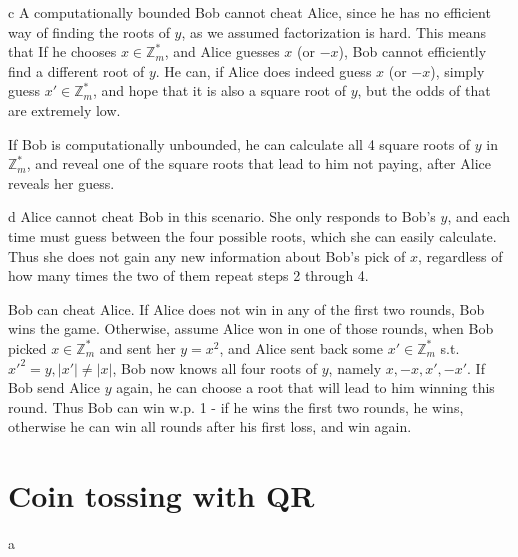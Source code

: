 \documentclass{article}
\begin{document}
\begin{paragraph}
    c A computationally bounded Bob cannot cheat Alice, since he has no efficient way of finding the roots of \(y\), as we assumed factorization is hard. This means that If he chooses \(x \in \mathbb{Z}^*_m\), and Alice guesses \(x\) (or \(-x\)), Bob cannot efficiently find a different root of \(y\). He can, if Alice does indeed guess \(x\) (or \(-x\)), simply guess \(x' \in \mathbb{Z}^*_m\), and hope that it is also a square root of \(y\), but the odds of that are extremely low.
    
    If Bob is computationally unbounded, he can calculate all 4 square roots of \(y\) in \(\mathbb{Z}^*_m\), and reveal one of the square roots that lead to him not paying, after Alice reveals her guess.
\end{paragraph}

\begin{paragraph}
    d Alice cannot cheat Bob in this scenario. She only responds to Bob's \(y\), and each time must guess between the four possible roots, which she can easily calculate. Thus she does not gain any new information about Bob's pick of \(x\), regardless of how many times the two of them repeat steps 2 through 4.
    
    Bob can cheat Alice. If Alice does not win in any of the first two rounds, Bob wins the game. Otherwise, assume Alice won in one of those rounds, when Bob picked \(x \in \mathbb{Z}^*_m\) and sent her \(y = x^2\), and Alice sent back some \(x' \in \mathbb{Z}^*_m\) s.t. \(x'^2 = y, |x'| \neq |x|\), Bob now knows all four roots of \(y\), namely \(x, -x, x', -x'\). If Bob send Alice \(y\) again, he can choose a root that will lead to him winning this round. Thus Bob can win w.p. 1 - if he wins the first two rounds, he wins, otherwise he can win all rounds after his first loss, and win again.
\end{paragraph}

\section{Coin tossing with QR}
\begin{paragraph}
    a 
\end{paragraph}
\end{document}
